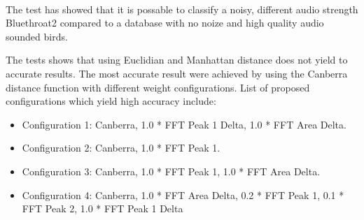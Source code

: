 \begin{figure}[htp]
    ~

    \caption{}
    \label{fig:results6}
\end{figure}

The test has showed that it is possable to classify a noisy, different audio strength Bluethroat2 compared to a database with no noize and high quality audio sounded birds.

The tests shows that using Euclidian and Manhattan distance does not yield to accurate results.
The most accurate result were achieved by using the Canberra distance function with different
weight configurations. List of proposed configurations which yield high accuracy include:
\begin{itemize}
  \item Configuration 1: Canberra, 1.0 * FFT Peak 1 Delta, 1.0 * FFT Area Delta.
  \item Configuration 2: Canberra, 1.0 * FFT Peak 1.
  \item Configuration 3: Canberra, 1.0 * FFT Peak 1, 1.0 * FFT Area Delta.
  \item Configuration 4: Canberra, 1.0 * FFT Area Delta, 0.2 * FFT Peak 1, 0.1 * FFT Peak 2, 1.0 * FFT Peak 1 Delta
\end{itemize}


